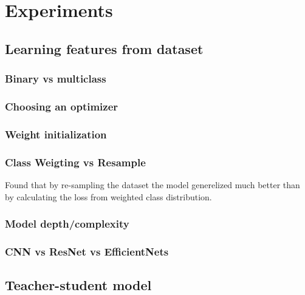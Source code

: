 \documentclass[thesis.tex]{subfiles}
\begin{document}
\chapter{Experiments} \label{chap:experiments}

\section{Learning features from dataset}

\subsection{Binary vs multiclass}

\subsection{Choosing an optimizer}

\subsection{Weight initialization}

\subsection{Class Weigting vs Resample}
Found that by re-sampling the dataset the model generelized much better than by calculating the loss from weighted class distribution.

\subsection{Model depth/complexity}


\subsection{CNN vs ResNet vs EfficientNets}



\section{Teacher-student model}
\end{document}
